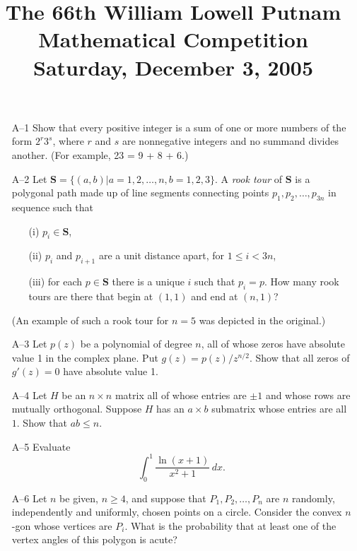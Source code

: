 \documentclass[amssymb,twocolumn,pra,10pt,aps]{revtex4-1}
\begin{document}
\title{The 66th William Lowell Putnam Mathematical Competition \\
    Saturday, December 3, 2005}
\maketitle

\begin{itemize}

\item[A--1]
Show that every positive integer is a sum of one or more numbers of the
form $2^r 3^s$, where $r$ and $s$ are nonnegative integers and no
summand divides another.
(For example, 23 = 9 + 8 + 6.)

\item[A--2]
Let $\mathbf{S} = \{(a,b) | a = 1, 2, \dots,n, b = 1,2,3\}$.
A \emph{rook tour} of $\mathbf{S}$ is a polygonal path made up of line
segments connecting points $p_1, p_2, \dots, p_{3n}$ in sequence such that
\begin{enumerate}
\item[(i)] $p_i \in \mathbf{S}$,
\item[(ii)] $p_i$ and $p_{i+1}$ are a unit distance apart, for
$1 \leq i <3n$,
\item[(iii)] for each $p \in \mathbf{S}$ there is a unique $i$ such that
$p_i = p$. How many rook tours are there that begin at $(1,1)$
and end at $(n,1)$?
\end{enumerate}
(An example of such a rook tour for $n=5$ was depicted in the original.)

\item[A--3]
Let $p(z)$ be a polynomial of degree $n$, all of whose zeros have absolute
value 1 in the complex  plane. Put $g(z) = p(z)/z^{n/2}$. Show that all zeros
of $g'(z) = 0$ have absolute value 1.

\item[A--4]
Let $H$ be an $n \times n$ matrix all of whose entries are $\pm 1$ and
whose rows are mutually orthogonal. Suppose $H$ has an $a \times b$ submatrix
whose entries are all $1$. Show that $ab \leq n$.

\item[A--5]
Evaluate
\[
\int_0^1 \frac{\ln(x+1)}{x^2+1}\,dx.
\]

\item[A--6]
Let $n$ be given, $n \geq 4$, and suppose that $P_1, P_2, \dots, P_n$
are $n$ randomly, independently and uniformly, chosen points on a circle.
Consider the convex $n$-gon whose vertices are $P_i$. What is the
probability that at least one of the vertex angles of this polygon is
acute?


\end{itemize}
\end{document}
